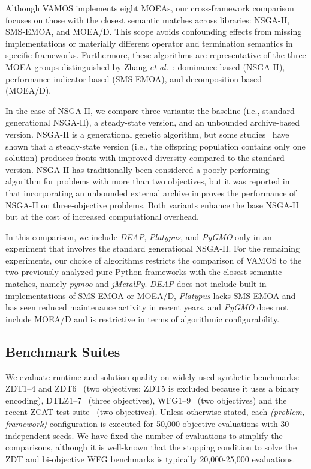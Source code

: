 \documentclass[final,5p,times,twocolumn]{elsarticle}
\newcommand{\VAMOS}{VAMOS}
\begin{document}
Although \VAMOS{} implements eight MOEAs, our cross-framework comparison focuses on those with the closest semantic matches across libraries: NSGA-II, SMS-EMOA, and MOEA/D. This scope avoids confounding effects from missing implementations or materially different operator and termination semantics in specific frameworks. Furthermore, these algorithms are representative of the three MOEA groups distinguished by Zhang \textit{et al.}~\cite{ZCTJ24}: dominance-based (NSGA-II), performance-indicator-based (SMS-EMOA), and decomposition-based (MOEA/D).

In the case of NSGA-II, we compare three variants: the baseline (i.e., standard generational NSGA-II), a steady-state version, and an unbounded archive-based version. NSGA-II is a generational genetic algorithm, but some studies~\cite{DNL+09} have shown that a steady-state version (i.e., the offspring population contains only one solution) produces fronts with improved diversity compared to the standard version. NSGA-II has traditionally been considered a poorly performing algorithm for problems with more than two objectives, but it was reported in~\cite{IPS20} that incorporating an unbounded external archive improves the performance of NSGA-II on three-objective problems. Both variants enhance the base NSGA-II but at the cost of increased computational overhead.

In this comparison, we include \textit{DEAP}, \textit{Platypus}, and \textit{PyGMO} only in an experiment that involves the standard generational NSGA-II. For the remaining experiments, our choice of algorithms restricts the comparison of \VAMOS{} to the two previously analyzed pure-Python frameworks with the closest semantic matches, namely \textit{pymoo} and \textit{jMetalPy}. \textit{DEAP} does not include built-in implementations of SMS-EMOA or MOEA/D, \textit{Platypus} lacks SMS-EMOA and has seen reduced maintenance activity in recent years, and \textit{PyGMO} does not include MOEA/D and is restrictive in terms of algorithmic configurability.

\subsection{Benchmark Suites}

We evaluate runtime and solution quality on widely used synthetic benchmarks: ZDT1--4 and ZDT6~\cite{ZDT00} (two objectives; ZDT5 is excluded because it uses a binary encoding), DTLZ1--7~\cite{DTL+02} (three objectives), WFG1--9~\cite{HHB+06} (two objectives) and the recent ZCAT test suite~\cite{ZCA+23} (two objectives). %
Unless otherwise stated, each \textit{(problem, framework)} configuration is executed for 50{,}000 objective evaluations with 30 independent seeds. We have fixed the number of evaluations to simplify the comparisons, although it is well-known that the stopping condition to solve the ZDT and bi-objective WFG benchmarks is typically 20{,}000-25{,}000 evaluations.
\end{document}
